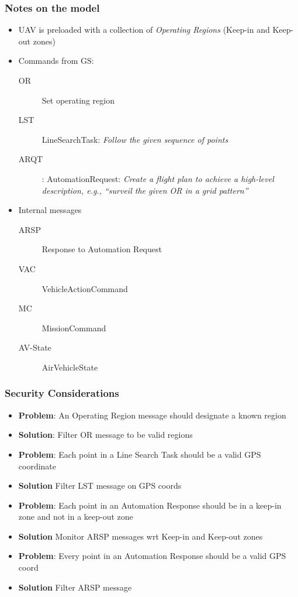 \documentclass{beamer}
\begin{document}
\begin{frame}\frametitle{Notes on the model}

\begin{itemize}
\item UAV is preloaded with a collection of \emph{Operating Regions}
  (Keep-in and Keep-out zones)
\item Commands from GS:
\begin{description}
  \item [OR] Set operating region
  \item [LST] LineSearchTask: \emph{Follow the given sequence of points}
  \item [ARQT] : AutomationRequest: \emph{Create a flight plan to
    achieve a high-level description, e.g., ``surveil the given OR in
    a grid pattern''}
\end{description}

\item Internal messages
\begin{description}
  \item [ARSP]  Response to Automation Request
  \item [VAC]  VehicleActionCommand
  \item [MC]  MissionCommand
  \item [AV-State] AirVehicleState
\end{description}

\end{itemize}

\end{frame}

\begin{frame}\frametitle{Security Considerations}

\begin{itemize}[<+->]
\item \textbf{Problem}: An Operating Region message should designate a known region
\item \textbf{Solution}: Filter OR message to be valid regions

\item \textbf{Problem}: Each point in a Line Search Task should be a valid GPS coordinate
\item \textbf{Solution} Filter LST message on GPS coords

\item \textbf{Problem}: Each point in an Automation Response should be
  in a keep-in zone and not in a keep-out zone
\item \textbf{Solution} Monitor ARSP messages wrt Keep-in and Keep-out zones

\item \textbf{Problem}: Every point in an Automation Response should be a valid GPS coord
\item \textbf{Solution} Filter ARSP message
\end{itemize}

\end{frame}
\end{document}
